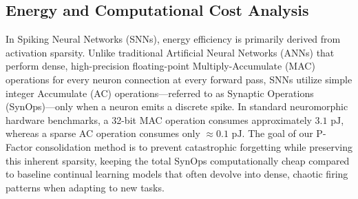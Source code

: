 \documentclass[5p,times]{elsarticle}
\begin{document}
\begin{table}[H]
    \caption{Performance on Spatio-Temporal Event Streams (N-MNIST, Epoch 3)}
    \begin{center}
    \label{tab:nmnist_results}
    \end{center}
\end{table}

\subsection{Energy and Computational Cost Analysis}

In Spiking Neural Networks (SNNs), energy efficiency is primarily derived from activation sparsity. Unlike traditional Artificial Neural Networks (ANNs) that perform dense, high-precision floating-point Multiply-Accumulate (MAC) operations for every neuron connection at every forward pass, SNNs utilize simple integer Accumulate (AC) operations---referred to as Synaptic Operations (SynOps)---only when a neuron emits a discrete spike. In standard neuromorphic hardware benchmarks, a 32-bit MAC operation consumes approximately $3.1\text{ pJ}$, whereas a sparse AC operation consumes only $\approx 0.1\text{ pJ}$. The goal of our P-Factor consolidation method is to prevent catastrophic forgetting while preserving this inherent sparsity, keeping the total SynOps computationally cheap compared to baseline continual learning models that often devolve into dense, chaotic firing patterns when adapting to new tasks.
\end{document}
